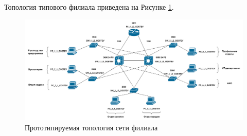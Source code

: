 \documentclass[14pt, a4paper]{extarticle}
\numberwithin{equation}{section}
\begin{document}
\begin{landscape}
Топология типового филиала приведена на Рисунке \ref{fig:filialTopo}.
\begin{figure}[H]
        \centering
        \includegraphics[scale=0.17]{topo_filial.png}
        \caption{Прототипируемая топология сети филиала}
        \label{fig:filialTopo}
\end{figure}
\end{landscape}
\end{document}
